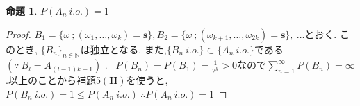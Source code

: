 \documentclass{jsarticle}
\newtheorem{prop}[thm]{命題}
\begin{document}
\begin{prop}
$P(A_{n} \ i.o.) = 1$
\end{prop}
\begin{proof}
$B_{1} = \lbrace \omega \ ; (\omega_{1},\dots,\omega_{k}) = \textbf {s}  \rbrace , B_{2} = \lbrace \omega \ ; (\omega_{k+1},\dots,\omega_{2k}) = \textbf {s}  \rbrace , \ \dots$とおく. このとき, ${\lbrace B_{n} \rbrace}_{n \in \mathbb{N}}$は独立となる. また,$\lbrace B_{n} \ i.o. \rbrace \subset \lbrace A_{n} \ i.o.\rbrace$である$( \because \ B_{l} = A_{(l-1)k + 1})$ . \ $P(B_{n}) = P(B_{1}) = \frac{1}{2^{k}} > 0$なので$\displaystyle\sum_{n=1}^{\infty}P(B_{n}) = \infty$.以上のことから補題5$(\textbf{II})$を使うと, $P(B_{n} \ i.o.) = 1 \le P(A_{n} \ i.o.) \ \therefore P(A_{n} \ i.o.)=1$
\end{proof}
\end{document}
